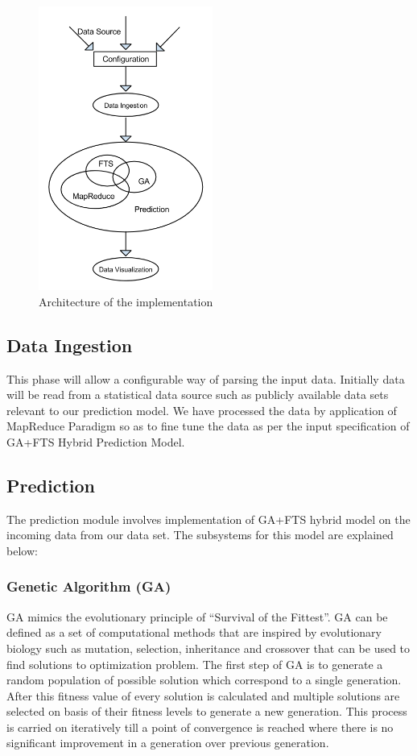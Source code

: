 \documentclass[12pt,journal,compsoc]{IEEEtran}
\begin{document}
\begin{figure}
\includegraphics[width=2.25in]{arch}
\caption{Architecture of the implementation}
\label{arch}
\end{figure}

\subsection{Data Ingestion}
This phase will allow a configurable way of parsing the input data. Initially data will be read from a statistical data source such as publicly available data sets relevant to our prediction model. We have processed the data by application of MapReduce Paradigm so as to fine tune the data as per the input specification of GA+FTS Hybrid Prediction Model.

\subsection{Prediction}
The prediction module involves implementation of GA+FTS hybrid model on the incoming data from our data set. The subsystems for this model are explained below:
 
\subsubsection{Genetic Algorithm (GA)}
 GA mimics the evolutionary principle of “Survival of the Fittest”. GA can be defined as a set of computational methods that are inspired by evolutionary biology such as mutation, selection, inheritance and crossover that can be used to find solutions to optimization problem. The first step of GA is to generate a random population of possible solution which correspond to a single generation. After this fitness value of every solution is calculated and multiple solutions are selected on basis of their fitness levels to generate a new generation. This process is carried on iteratively till a point of convergence is reached where there is no significant improvement in a generation over previous generation. 
\end{document}
